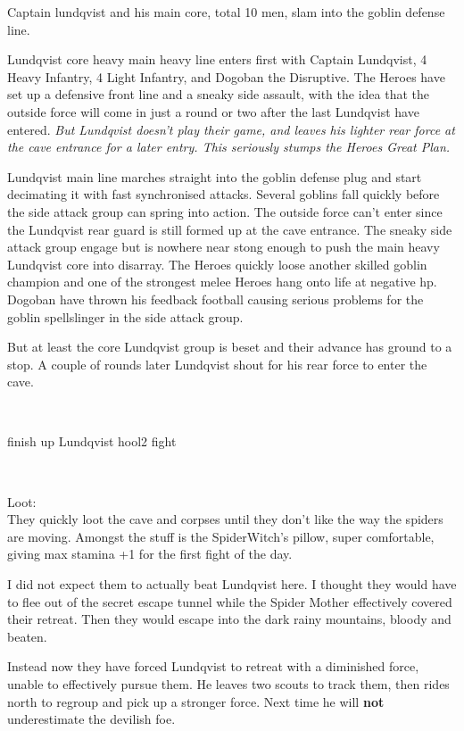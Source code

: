 Captain lundqvist and his main core, total 10 men, slam into the goblin defense line. 

Lundqvist core heavy main heavy line enters first with Captain Lundqvist, 4 Heavy Infantry, 4 Light Infantry, and Dogoban the Disruptive. The Heroes have set up a defensive front line and a sneaky side assault, with the idea that the outside force will come in just a round or two after the last Lundqvist have entered. \textit{But Lundqvist doesn't play their game, and leaves his lighter rear force at the cave entrance for a later entry. This seriously stumps the Heroes Great Plan.}

Lundqvist main line marches straight into the goblin defense plug and start decimating it with fast synchronised attacks. Several goblins fall quickly before the side attack group can spring into action. The outside force can't enter since the Lundqvist rear guard is still formed up at the cave entrance.
The sneaky side attack group engage but is nowhere near stong enough to push the main heavy Lundqvist core into disarray. The Heroes quickly loose another skilled goblin champion and one of the strongest melee Heroes hang onto life at negative hp. Dogoban have thrown his feedback football causing serious problems for the goblin spellslinger in the side attack group.

But at least the core Lundqvist group is beset and their advance has ground to a stop. A couple of rounds later Lundqvist shout for his rear force to enter the cave.




\

\todo finish up Lundqvist hool2 fight

\

Loot:\\
They quickly loot the cave and corpses until they don't like the way the spiders are moving. Amongst the stuff is the SpiderWitch's pillow, super comfortable, giving max stamina +1 for the first fight of the day.


\begin{readoutloud}
I did not expect them to actually beat Lundqvist here. I thought they would have to flee out of the secret escape tunnel while the Spider Mother effectively covered their retreat. Then they would escape into the dark rainy mountains, bloody and beaten.

Instead now they have forced Lundqvist to retreat with a diminished force, unable to effectively pursue them. He leaves two scouts to track them, then rides north to regroup and pick up a stronger force. Next time he will \textbf{not} underestimate the devilish foe.
\end{readoutloud}


